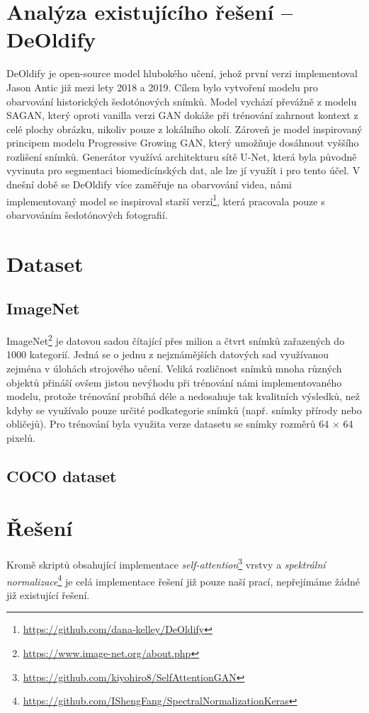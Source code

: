 \documentclass[12pt, a4paper]{article}
\begin{document}
    \section{Analýza existujícího řešení -- DeOldify}
    DeOldify \cite{deoldify} je open-source model hlubokého učení, jehož první verzi implementoval Jason Antic již mezi lety 2018 a 2019. Cílem bylo vytvoření modelu pro obarvování historických šedotónových snímků. Model vychází převážně z modelu SAGAN, který oproti vanilla verzi GAN dokáže při trénování zahrnout kontext z celé plochy obrázku, nikoliv pouze z lokálního okolí. Zároveň je model inspirovaný principem modelu Progressive Growing GAN, který umožňuje dosáhnout vyššího rozlišení snímků. Generátor využívá architekturu sítě U-Net, která byla původně vyvinuta pro segmentaci biomedicínských dat, ale lze jí  využít i pro tento účel. V dnešní době se DeOldify více zaměřuje na obarvování videa, námi implementovaný model se inspiroval starší verzí\footnote{\url{https://github.com/dana-kelley/DeOldify}}, která pracovala pouze s obarvováním šedotónových fotografií.
    
    \section{Dataset}
    
    \subsection{ImageNet}
    ImageNet\footnote{\url{https://www.image-net.org/about.php}} je datovou sadou čítající přes milion a čtvrt snímků zařazených do 1000 kategorií. Jedná se o jednu z nejznámějších datových sad využívanou zejména v úlohách strojového učení. Veliká rozličnost snímků mnoha různých objektů přináší ovšem jistou nevýhodu při trénování námi implementovaného modelu, protože trénování probíhá déle a nedosahuje tak kvalitních výsledků, než kdyby se využívalo pouze určité podkategorie snímků (např. snímky přírody nebo obličejů). Pro trénování byla využita verze datasetu se snímky rozměrů 64 $\times$ 64 pixelů.
    
    \subsection{COCO dataset}
    
    \section{Řešení}
    Kromě skriptů obsahující implementace \textit{self-attention}\footnote{\url{https://github.com/kiyohiro8/SelfAttentionGAN}} vrstvy a \textit{spektrální normalizace}\footnote{\url{https://github.com/IShengFang/SpectralNormalizationKeras}} je celá implementace řešení již pouze naší prací, nepřejímáme žádné již existující řešení. 
    
\end{document}

